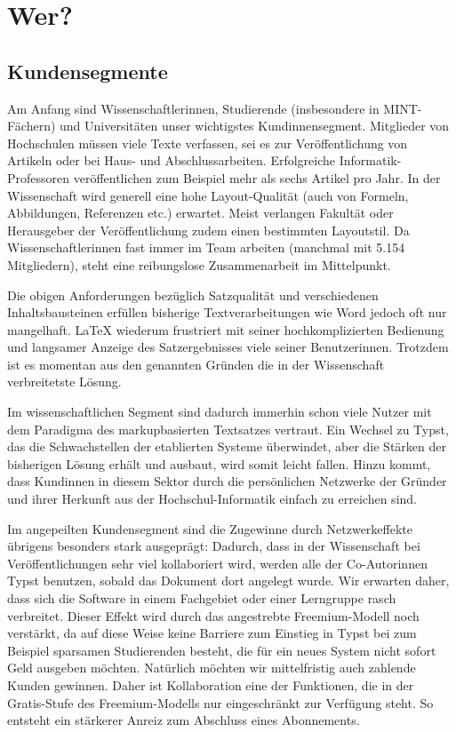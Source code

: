 \documentclass[11pt, a4paper]{article}
\newcommand{\gender}{\raisebox{-.25em}{*}}
\let\oldsection\section
\renewcommand\section{\clearpage\oldsection}
\renewcommand{\glossary} {\marginsymbol{\textbf{↪}}}
\newcommand{\cited}[1]{\marginsymbol{\textbf{↗} #1}}
\newcommand{\marginsymbol}[1] {\protect\marginsymbolhelper{#1}}
\newcommand{\marginsymbolhelper}[1] {\tabto*{-1cm}\makebox[0cm]{#1}\tabto*{\TabPrevPos}}
\begin{document}
\section*{Wer?}
\subsection*{Kundensegmente}

Am Anfang sind Wissenschaftler\gender{}innen, Studierende (insbesondere in MINT-Fächern) und Universitäten unser wichtigstes Kund\gender{}innensegment. Mitglieder von Hochschulen müssen viele Texte verfassen, sei es zur Veröffentlichung von Artikeln oder bei Haus- und Abschlussarbeiten. \cited{4} Erfolgreiche Informatik-Professoren veröffentlichen zum Beispiel mehr als sechs Artikel pro Jahr. In der Wissenschaft wird generell eine hohe Layout-Qualität (auch von Formeln, Abbildungen, Referenzen etc.) erwartet. Meist verlangen Fakultät oder Herausgeber der Veröffentlichung zudem einen bestimmten Layoutstil. Da Wissenschaftler\gender{}innen fast immer im Team arbeiten (manchmal mit 5.154 Mitgliedern\cited{5}), steht eine reibungslose Zusammenarbeit im Mittelpunkt.

Die obigen Anforderungen bezüglich Satzqualität und verschiedenen Inhaltsbausteinen erfüllen bisherige Textverarbeitungen wie Word jedoch oft nur mangelhaft. LaTeX wiederum \cited{6}frustriert mit seiner hochkomplizierten Bedienung und langsamer Anzeige des Satzergebnisses viele seiner Benutzer\gender{}innen. Trotzdem ist es momentan aus den genannten Gründen die in der Wissenschaft verbreitetste Lösung.

Im wissenschaftlichen Segment sind dadurch immerhin schon viele Nutzer mit dem Paradigma des markupbasierten Textsatzes vertraut. Ein Wechsel zu Typst, das die Schwachstellen der etablierten Systeme überwindet, aber die Stärken der bisherigen Lösung erhält und ausbaut, wird somit leicht fallen. Hinzu kommt, dass Kund\gender{}innen in diesem Sektor durch die persönlichen Netzwerke der Gründer und ihrer Herkunft aus der Hochschul-Informatik einfach zu erreichen sind.


Im angepeilten Kundensegment sind die Zugewinne durch \glossary Netzwerkeffekte übrigens besonders stark ausgeprägt: Dadurch, dass in der Wissenschaft bei Veröffentlichungen sehr viel kollaboriert wird, werden alle der Co-Autor\gender{}innen Typst benutzen, sobald das Dokument dort angelegt wurde. Wir erwarten daher, dass sich die Software in einem Fachgebiet oder einer Lerngruppe rasch verbreitet. Dieser Effekt wird durch das angestrebte \glossary Freemium-Modell noch verstärkt, da auf diese Weise keine Barriere zum Einstieg in Typst bei zum Beispiel sparsamen Studierenden besteht, die für ein neues System nicht sofort Geld ausgeben möchten. Natürlich möchten wir mittelfristig auch zahlende Kunden gewinnen. Daher ist Kollaboration eine der Funktionen, die in der Gratis-Stufe des Freemium-Modells nur eingeschränkt zur Verfügung steht. So entsteht ein stärkerer Anreiz zum Abschluss eines Abonnements.
\end{document}
